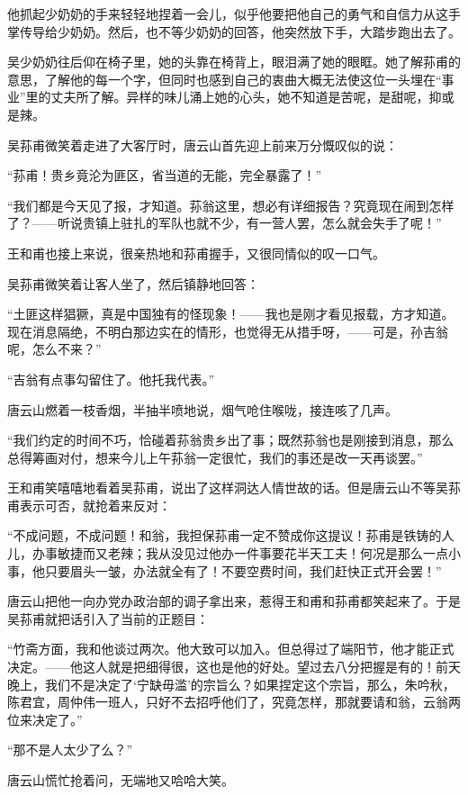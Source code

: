 \par 他抓起少奶奶的手来轻轻地捏着一会儿，似乎他要把他自己的勇气和自信力从这手掌传导给少奶奶。然后，也不等少奶奶的回答，他突然放下手，大踏步跑出去了。
\par 吴少奶奶往后仰在椅子里，她的头靠在椅背上，眼泪满了她的眼眶。她了解荪甫的意思，了解他的每一个字，但同时也感到自己的衷曲大概无法使这位一头埋在“事业”里的丈夫所了解。异样的味儿涌上她的心头，她不知道是苦呢，是甜呢，抑或是辣。
\par 吴荪甫微笑着走进了大客厅时，唐云山首先迎上前来万分慨叹似的说：
\par “荪甫！贵乡竟沦为匪区，省当道的无能，完全暴露了！”
\par “我们都是今天见了报，才知道。荪翁这里，想必有详细报告？究竟现在闹到怎样了？——听说贵镇上驻扎的军队也就不少，有一营人罢，怎么就会失手了呢！”
\par 王和甫也接上来说，很亲热地和荪甫握手，又很同情似的叹一口气。
\par 吴荪甫微笑着让客人坐了，然后镇静地回答：
\par “土匪这样猖獗，真是中国独有的怪现象！——我也是刚才看见报载，方才知道。现在消息隔绝，不明白那边实在的情形，也觉得无从措手呀，——可是，孙吉翁呢，怎么不来？”
\par “吉翁有点事勾留住了。他托我代表。”
\par 唐云山燃着一枝香烟，半抽半喷地说，烟气呛住喉咙，接连咳了几声。
\par “我们约定的时间不巧，恰碰着荪翁贵乡出了事；既然荪翁也是刚接到消息，那么总得筹画对付，想来今儿上午荪翁一定很忙，我们的事还是改一天再谈罢。”
\par 王和甫笑嘻嘻地看着吴荪甫，说出了这样洞达人情世故的话。但是唐云山不等吴荪甫表示可否，就抢着来反对：
\par “不成问题，不成问题！和翁，我担保荪甫一定不赞成你这提议！荪甫是铁铸的人儿，办事敏捷而又老辣；我从没见过他办一件事要花半天工夫！何况是那么一点小事，他只要眉头一皱，办法就全有了！不要空费时间，我们赶快正式开会罢！”
\par 唐云山把他一向办党办政治部的调子拿出来，惹得王和甫和荪甫都笑起来了。于是吴荪甫就把话引入了当前的正题目：
\par “竹斋方面，我和他谈过两次。他大致可以加入。但总得过了端阳节，他才能正式决定。——他这人就是把细得很，这也是他的好处。望过去八分把握是有的！前天晚上，我们不是决定了‘宁缺毋滥’的宗旨么？如果捏定这个宗旨，那么，朱吟秋，陈君宜，周仲伟一班人，只好不去招呼他们了，究竟怎样，那就要请和翁，云翁两位来决定了。”
\par “那不是人太少了么？”
\par 唐云山慌忙抢着问，无端地又哈哈大笑。
